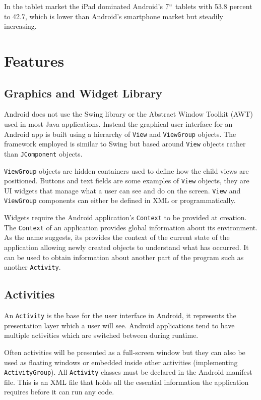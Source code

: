 \documentclass{report}
\begin{document}
In the tablet market the iPad dominated Android's $7\verb+"+$ tablets with 53.8 percent to 42.7, which is lower than Android's smartphone market but steadily increasing.

\section{Features}

\subsection{Graphics and Widget Library}
\label{sub:graphics_and_widgets}

Android does not use the Swing library or the Abstract Window Toolkit (AWT) used in most Java applications. Instead the graphical user interface for an Android app is built using a hierarchy of {\tt View} and {\tt ViewGroup} objects. The framework employed is similar to Swing but based around {\tt View} objects rather than {\tt JComponent} objects.

{\tt ViewGroup} objects are hidden containers used to define how the child views are positioned. Buttons and text fields are some examples of {\tt View} objects, they are UI widgets that manage what a user can see and do on the screen. {\tt View} and {\tt ViewGroup} components can either be defined in XML or programmatically.

Widgets require the Android application's {\tt Context} to be provided at creation. The {\tt Context} of an application provides global information about its environment. As the name suggests, its provides the context of the current state of the application allowing newly created objects to understand what has occurred. It can be used to obtain information about another part of the program such as another {\tt Activity}.

\subsection{Activities}
\label{sub:activities}

An {\tt Activity} is the base for the user interface in Android, it represents the presentation layer which a user will see. Android applications tend to have multiple activities which are switched between during runtime.

Often activities will be presented as a full-screen window but they can also be used as floating windows or embedded inside other activities (implementing {\tt ActivityGroup}). All {\tt Activity} classes must be declared in the Android manifest file. This is an XML file that holds all the essential information the application requires before it can run any code.
\end{document}

